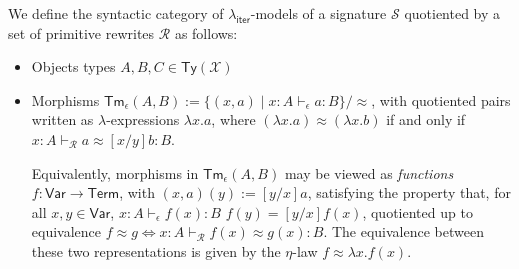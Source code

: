 \documentclass[acmsmall,screen,review]{acmart}
\newcommand{\mc}[1]{\ensuremath{\mathcal{#1}}}
\newcommand{\ms}[1]{\ensuremath{\mathsf{#1}}}
\newcommand{\hasty}[4]{#1 \vdash_{#2} #3: {#4}}
\newcommand{\teqv}{\approx}
\newcommand{\tmeq}[5]{#1 \vdash_{#2} #3 \teqv #4 : {#5}}
\newcommand{\subiterexp}{\texorpdfstring{\(\lambda_{\ms{iter}}\)}{lambda-iter}}
\begin{document}
\label{apx:syn-model}

We define the syntactic category of \subiterexp{}-models of a signature $\mc{S}$ quotiented by a set
of primitive rewrites $\mc{R}$ as follows:
\begin{itemize}
  \item Objects types $A, B, C \in \ms{Ty}(\mc{X})$
  \item Morphisms $\ms{Tm}_\epsilon(A, B) := \{(x, a) \mid \hasty{x : A}{\epsilon}{a}{B}\} /
  \approx$, with quotiented pairs written as $\lambda$-expressions $\lambda x . a$, where $(\lambda
  x . a) \approx (\lambda x . b)$ if and only if $\tmeq{x : A}{\mc{R}}{a}{[x/y]b}{B}$. 

  Equivalently, morphisms in $\ms{Tm}_\epsilon(A, B)$ may be viewed as \emph{functions} $f :
  \ms{Var} \to \ms{Term}$, with $(x, a)(y) := [y/x]a$, satisfying the property that, for all $x, y
  \in \ms{Var}$, $\hasty{x : A}{\epsilon}{f(x)}{B}$ $f(y) = [y/x]f(x)$, quotiented up to equivalence
  $f \approx g \iff \tmeq{x : A}{\mc{R}}{f(x)}{g(x)}{B}$. The equivalence between these two
  representations is given by the $\eta$-law $f \approx \lambda x. f(x)$.


\end{itemize}
\end{document}

